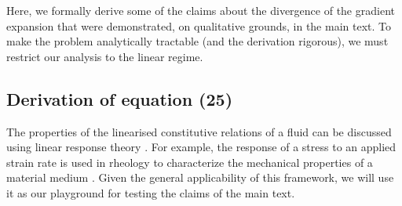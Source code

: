 \documentclass[a4paper, amsfonts, amssymb, amsmath, reprint, showkeys, twoside,notitlepage]{revtex4-2}
\begin{document}
\setcounter{equation}{0}
\setcounter{figure}{0}
\setcounter{table}{0}
\setcounter{page}{1}
\renewcommand{\theequation}{S\arabic{equation}}
\renewcommand{\thefigure}{S\arabic{figure}}



Here, we formally derive some of the claims about the divergence of the gradient expansion that were demonstrated, on qualitative grounds, in the main text. To make the problem analytically tractable (and the derivation rigorous), we must restrict our analysis to the linear regime.


\subsection{Derivation of equation (25)}

The properties of the linearised constitutive relations of a fluid can be discussed using linear response theory \cite{Denicol_Relaxation_2011}. For example, the response of a stress to an applied strain rate is used in rheology to characterize the mechanical properties of a material medium \cite{Steffe_book}. Given the general applicability of this framework, we will use it as our playground for testing the claims of the main text.
\end{document}
